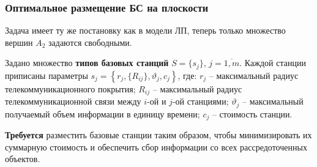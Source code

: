 \begin{frame}
    \frametitle{Оптимальное размещение БС на плоскости}
    \justifying

    Задача имеет ту же постановку как в модели ЛП, теперь  только множество вершин $A_2$ задаются свободными. 

    \bigskip
    
    Задано множество \textbf{типов базовых станций} $S = \{s_j\}$, $j=\overline{1,m}$. Каждой станции приписаны параметры $s_j = \left\{r_j, \{R_{ij}\}, \vartheta_j, c_j \right\}$, где:
    $r_j$ -- максимальный радиус телекоммуникационного покрытия; $R_{ij}$ -- максимальный радиус телекоммуникационной связи между $i$-ой и $j$-ой станциями; $\vartheta_j$ -- максимальный получаемый объем информации в единицу времени; $c_j$ -- стоимость станции.
    
    \bigskip
    \textbf{Требуется} разместить базовые станции таким образом, чтобы минимизировать их суммарную стоимость и обеспечить сбор информации со всех рассредоточенных объектов.

\end{frame}

